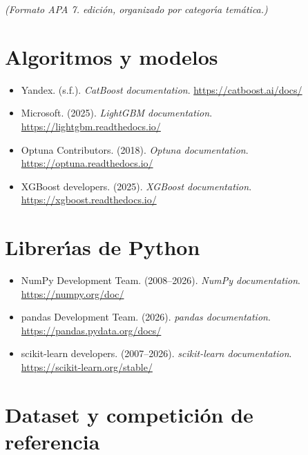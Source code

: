 \documentclass[12pt, a4paper, oneside]{report}
\begin{document}
\noindent\textit{(Formato APA 7.\textordfeminine{} edici\'on, organizado por categor\'{\i}a tem\'atica.)}

\bigskip

\section*{Algoritmos y modelos}

\begin{itemize}[leftmargin=2em, noitemsep]

\item Yandex. (s.f.). \textit{CatBoost documentation}. \url{https://catboost.ai/docs/}

\item Microsoft. (2025). \textit{LightGBM documentation}. \url{https://lightgbm.readthedocs.io/}

\item Optuna Contributors. (2018). \textit{Optuna documentation}. \url{https://optuna.readthedocs.io/}

\item XGBoost developers. (2025). \textit{XGBoost documentation}. \url{https://xgboost.readthedocs.io/}

\end{itemize}

\section*{Librer\'{\i}as de Python}

\begin{itemize}[leftmargin=2em, noitemsep]

\item NumPy Development Team. (2008--2026). \textit{NumPy documentation}. \url{https://numpy.org/doc/}

\item pandas Development Team. (2026). \textit{pandas documentation}. \url{https://pandas.pydata.org/docs/}

\item scikit-learn developers. (2007--2026). \textit{scikit-learn documentation}. \url{https://scikit-learn.org/stable/}

\end{itemize}

\section*{Dataset y competici\'on de referencia}
\end{document}
